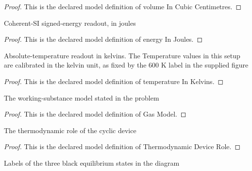 \begin{proof}
  This is the declared model definition of volume In Cubic Centimetres.
\end{proof}
\begin{definition}
  \label{def:physics:phyx-mini-0428:phyxminiproblems-problemphyxmini0428-energyinjoules}
  Coherent-SI signed-energy readout, in joules
\end{definition}
\begin{proof}
  This is the declared model definition of energy In Joules.
\end{proof}
\begin{definition}
  \label{def:physics:phyx-mini-0428:phyxminiproblems-problemphyxmini0428-temperatureinkelvins}
  Absolute-temperature readout in kelvins. The Temperature values in this setup are calibrated in the kelvin unit, as fixed by the 600 K label in the supplied figure
\end{definition}
\begin{proof}
  This is the declared model definition of temperature In Kelvins.
\end{proof}
\begin{definition}
  \label{def:physics:phyx-mini-0428:phyxminiproblems-problemphyxmini0428-gasmodel}
  The working-substance model stated in the problem
\end{definition}
\begin{proof}
  This is the declared model definition of Gas Model.
\end{proof}
\begin{definition}
  \label{def:physics:phyx-mini-0428:phyxminiproblems-problemphyxmini0428-thermodynamicdevicerole}
  The thermodynamic role of the cyclic device
\end{definition}
\begin{proof}
  This is the declared model definition of Thermodynamic Device Role.
\end{proof}
\begin{definition}
  \label{def:physics:phyx-mini-0428:phyxminiproblems-problemphyxmini0428-statelabel}
  Labels of the three black equilibrium states in the diagram
\end{definition}
